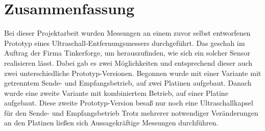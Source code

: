 \section{Zusammenfassung}
Bei dieser Projektarbeit wurden Messungen an einem zuvor selbst entworfenen Prototyp eines Ultraschall-Entfernungsmessers durchgeführt. Das geschah im Auftrag der Firma Tinkerforge, um herauszufinden, wie sich ein solcher Sensor realisieren lässt. Dabei gab es zwei Möglichkeiten und entsprechend dieser auch zwei unterschiedliche Prototyp-Versionen. Begonnen wurde mit einer Variante mit getrenntem Sende- und Empfangsbetrieb, auf zwei Platinen aufgebaut. Danach wurde eine zweite Variante mit kombiniertem Betrieb, auf einer Platine aufgebaut. Diese zweite Prototyp-Version besaß nur noch eine Ultraschallkapsel für den Sende- und Empfangsbetrieb Trotz mehrerer notwendiger Veränderungen an den Platinen ließen sich Aussagekräftige Messungen durchführen.